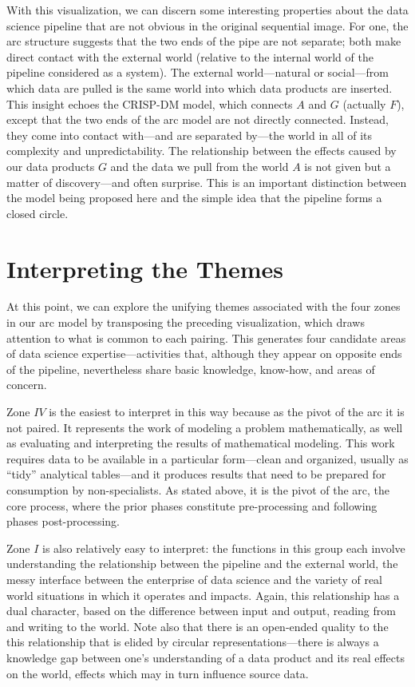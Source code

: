 \documentclass[
  letterpaper,
]{report}
\begin{document}
With this visualization, we can discern some interesting properties
about the data science pipeline that are not obvious in the original
sequential image. For one, the arc structure suggests that the two ends
of the pipe are not separate; both make direct contact with the external
world (relative to the internal world of the pipeline considered as a
system). The external world---natural or social---from which data are
pulled is the same world into which data products are inserted. This
insight echoes the CRISP-DM model, which connects \(A\) and \(G\)
(actually \(F\)), except that the two ends of the arc model are not
directly connected. Instead, they come into contact with---and are
separated by---the world in all of its complexity and unpredictability.
The relationship between the effects caused by our data products \(G\)
and the data we pull from the world \(A\) is not given but a matter of
discovery---and often surprise. This is an important distinction between
the model being proposed here and the simple idea that the pipeline
forms a closed circle.

\hypertarget{interpreting-the-themes}{%
\chapter{Interpreting the Themes}\label{interpreting-the-themes}}

At this point, we can explore the unifying themes associated with the
four zones in our arc model by transposing the preceding visualization,
which draws attention to what is common to each pairing. This generates
four candidate areas of data science expertise---activities that,
although they appear on opposite ends of the pipeline, nevertheless
share basic knowledge, know-how, and areas of concern.

Zone \(IV\) is the easiest to interpret in this way because as the pivot
of the arc it is not paired. It represents the work of modeling a
problem mathematically, as well as evaluating and interpreting the
results of mathematical modeling. This work requires data to be
available in a particular form---clean and organized, usually as
``tidy'' analytical tables---and it produces results that need to be
prepared for consumption by non-specialists. As stated above, it is the
pivot of the arc, the core process, where the prior phases constitute
pre-processing and following phases post-processing.

Zone \(I\) is also relatively easy to interpret: the functions in this
group each involve understanding the relationship between the pipeline
and the external world, the messy interface between the enterprise of
data science and the variety of real world situations in which it
operates and impacts. Again, this relationship has a dual character,
based on the difference between input and output, reading from and
writing to the world. Note also that there is an open-ended quality to
the this relationship that is elided by circular representations---there
is always a knowledge gap between one's understanding of a data product
and its real effects on the world, effects which may in turn influence
source data.
\end{document}

